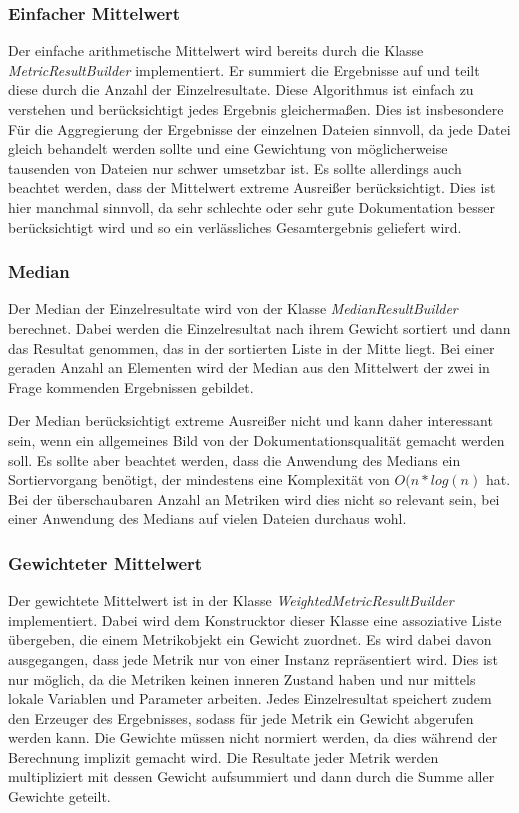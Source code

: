 \subsubsection{Einfacher Mittelwert}
Der einfache arithmetische  Mittelwert wird bereits durch die Klasse \textit{MetricResultBuilder} implementiert. Er summiert die Ergebnisse auf und teilt diese durch die Anzahl der Einzelresultate. Diese Algorithmus ist einfach zu verstehen und berücksichtigt jedes Ergebnis gleichermaßen. Dies ist insbesondere Für die Aggregierung der Ergebnisse der einzelnen Dateien sinnvoll, da jede Datei gleich behandelt werden sollte und eine Gewichtung von möglicherweise tausenden von Dateien nur schwer umsetzbar ist. Es sollte allerdings auch beachtet werden, dass der Mittelwert extreme Ausreißer berücksichtigt. Dies ist hier manchmal sinnvoll, da sehr schlechte oder sehr gute Dokumentation besser berücksichtigt wird und so ein verlässliches Gesamtergebnis geliefert wird. 

\subsubsection{Median}
Der Median der Einzelresultate wird von der Klasse \textit{MedianResultBuilder} berechnet. Dabei werden die Einzelresultat nach ihrem Gewicht sortiert und dann das Resultat genommen, das in der sortierten Liste in der Mitte liegt. Bei einer geraden Anzahl an Elementen wird der Median aus den Mittelwert der zwei in Frage kommenden Ergebnissen gebildet. 

Der Median berücksichtigt extreme Ausreißer nicht und kann daher interessant sein, wenn ein allgemeines Bild von der Dokumentationsqualität gemacht werden soll. Es sollte aber beachtet werden, dass die Anwendung des Medians ein Sortiervorgang benötigt, der mindestens eine Komplexität von $O(n*log(n)$ hat. Bei der überschaubaren Anzahl an Metriken wird dies nicht so relevant sein, bei einer Anwendung des Medians auf vielen Dateien durchaus wohl. 

\subsubsection{Gewichteter Mittelwert}
Der gewichtete Mittelwert ist in der Klasse \textit{WeightedMetricResultBuilder} implementiert. Dabei wird dem Konstrucktor dieser Klasse eine assoziative Liste übergeben, die einem Metrikobjekt ein Gewicht zuordnet.  Es wird dabei davon ausgegangen, dass jede Metrik nur von einer Instanz repräsentiert wird. Dies ist nur möglich, da die Metriken keinen inneren Zustand haben und nur mittels lokale Variablen und Parameter arbeiten. Jedes Einzelresultat speichert zudem den Erzeuger des Ergebnisses, sodass für jede Metrik ein Gewicht abgerufen werden kann. Die Gewichte müssen nicht normiert werden, da dies während der Berechnung implizit gemacht wird. Die Resultate jeder Metrik werden multipliziert mit dessen Gewicht aufsummiert und dann durch die Summe aller Gewichte geteilt. 

